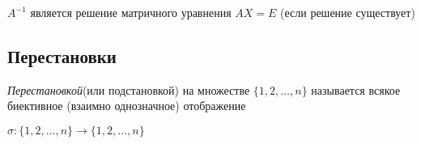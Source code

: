 \begin{consequence}
    $A^{-1}$ является решение матричного уравнения $AX = E$ (если решение существует)
\end{consequence}

\subsection{Перестановки}

\begin{definition}
    \textit{Перестановкой}(или подстановкой) на множестве $\{1, 2, \dots, n\}$ называется всякое биективное (взаимно однозначное) отображение  

    $\sigma : \{1, 2, \dots, n\} \to \{1, 2, \dots, n\}$
\end{definition}
